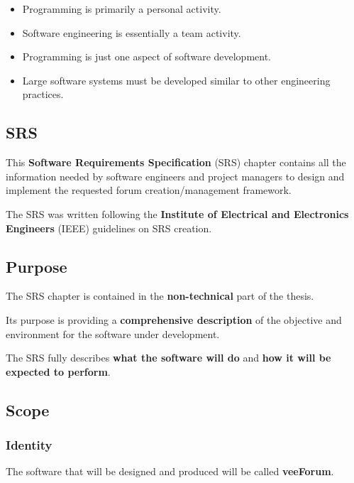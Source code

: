 \documentclass[12pt]{report}
\renewcommand\emph{\textbf}
\begin{document}
                        \begin{itemize}
                            \item Programming is primarily a personal activity.
                            \item Software engineering is essentially a team activity.
                        \end{itemize}

                        \begin{itemize}
                            \item Programming is just one aspect of software development.
                            \item Large software systems must be developed similar to other engineering practices.
                        \end{itemize}

                \subsection{SRS}

                    This \emph{Software Requirements Specification} (SRS) chapter contains all the information needed by software engineers and project managers to design and implement the requested forum creation/management framework.

                    The SRS was written following the \emph{Institute of Electrical and Electronics Engineers} (IEEE) guidelines on SRS creation.

                \subsection{Purpose}
                    The SRS chapter is contained in the \emph{non-technical} part of the thesis.

                    Its purpose is providing a \emph{comprehensive description} of the objective and environment for the software under development.

                    The SRS fully describes \emph{what the software will do} and \emph{how it will be expected to perform}.

                \subsection{Scope}

                    \subsubsection{Identity}
                        The software that will be designed and produced will be called \emph{veeForum}.
\end{document}
